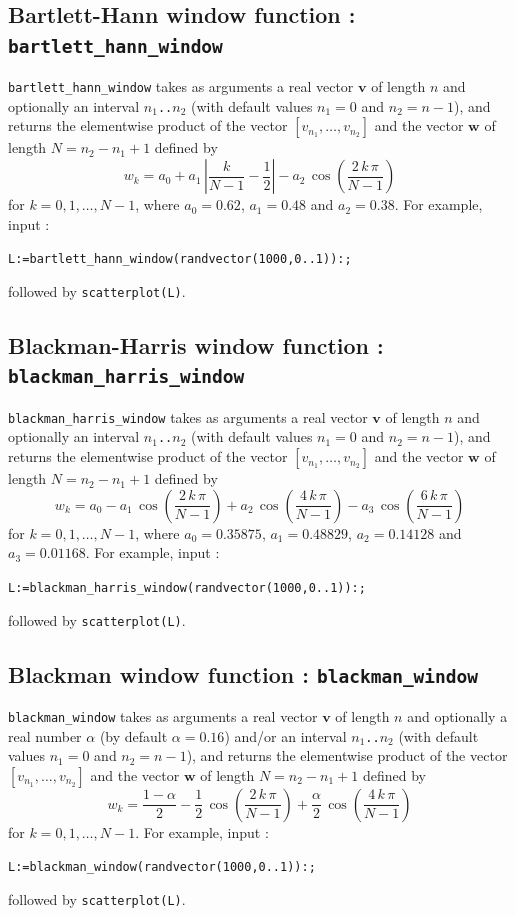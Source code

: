 \documentclass[a4paper,11pt]{book}
\begin{document}
\subsection{Bartlett-Hann window function : {\tt bartlett\_hann\_window}}
{\tt bartlett\_hann\_window} takes as arguments a real vector $ \mathbf{v} $ of length $ n $ and optionally an interval $ n_1 ${\tt ..}$ n_2 $ (with default values $ n_1=0 $ and $ n_2=n-1 $), and returns the elementwise product of the vector $ [v_{n_1},\dots,v_{n_2}] $ and the vector $ \mathbf{w} $ of length $ N=n_2-n_1+1 $ defined by
\[ w_k=a_0+a_1\,\left|\frac{k}{N-1}-\frac{1}{2}\right|-a_2\,\cos\left(\frac{2\,k\,\pi}{N-1}\right) \]
for $ k=0,1,\dots,N-1 $, where $ a_0=0.62 $, $ a_1=0.48 $ and $ a_2=0.38 $. For example, input :
\begin{center}
	{\tt L:=bartlett\_hann\_window(randvector(1000,0..1)):;}
\end{center}
followed by {\tt scatterplot(L)}.

\subsection{Blackman-Harris window function : {\tt blackman\_harris\_window}}
{\tt blackman\_harris\_window} takes as arguments a real vector $ \mathbf{v} $ of length $ n $ and optionally an interval $ n_1 ${\tt ..}$ n_2 $ (with default values $ n_1=0 $ and $ n_2=n-1 $), and returns the elementwise product of the vector $ [v_{n_1},\dots,v_{n_2}] $ and the vector $ \mathbf{w} $ of length $ N=n_2-n_1+1 $ defined by
\[ w_k=a_0-a_1\,\cos\left(\frac{2\,k\,\pi}{N-1}\right)+a_2\,\cos\left(\frac{4\,k\,\pi}{N-1}\right)-a_3\,\cos\left(\frac{6\,k\,\pi}{N-1}\right) \]
for $ k=0,1,\dots,N-1 $, where $ a_0=0.35875 $, $ a_1=0.48829 $, $ a_2=0.14128 $ and $ a_3=0.01168 $. For example, input :
\begin{center}
	{\tt L:=blackman\_harris\_window(randvector(1000,0..1)):;}
\end{center}
followed by {\tt scatterplot(L)}.

\subsection{Blackman window function : {\tt blackman\_window}}
{\tt blackman\_window} takes as arguments a real vector $ \mathbf{v} $ of length $ n $ and optionally a real number $ \alpha $ (by default $ \alpha=0.16 $) and/or an interval $ n_1 ${\tt ..}$ n_2 $ (with default values $ n_1=0 $ and $ n_2=n-1 $), and returns the elementwise product of the vector $ [v_{n_1},\dots,v_{n_2}] $ and the vector $ \mathbf{w} $ of length $ N=n_2-n_1+1 $ defined by
\[ w_k=\frac{1-\alpha}{2}-\frac{1}{2}\,\cos\left(\frac{2\,k\,\pi}{N-1}\right)+\frac{\alpha}{2}\,\cos\left(\frac{4\,k\,\pi}{N-1}\right) \]
for $ k=0,1,\dots,N-1 $. For example, input :
\begin{center}
	{\tt L:=blackman\_window(randvector(1000,0..1)):;}
\end{center}
followed by {\tt scatterplot(L)}.
\end{document}
